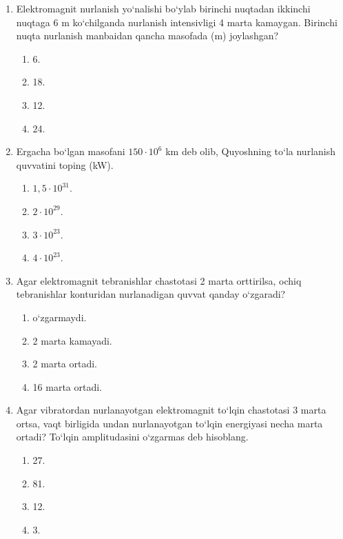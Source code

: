 \begin{enumerate}
\item Elektromagnit nurlanish yo‘nalishi bo‘ylab birinchi nuqtadan ikkinchi nuqtaga 6 m ko‘chilganda nurlanish intensivligi 4 marta kamaygan. Birinchi nuqta nurlanish manbaidan qancha masofada (m) joylashgan?
\begin{enumerate}[label=\Alph*)]
\item 6.
\item 18.
\item 12.
\item 24.
\end{enumerate}

\item Ergacha bo‘lgan masofani $150\cdot 10^6$ km deb olib, Quyoshning to‘la nurlanish quvvatini toping (kW).
\begin{enumerate}[label=\Alph*)]
\item $1,5\cdot 10^{31}$.
\item $2\cdot 10^{29}$.
\item $3\cdot 10^{23}$.
\item $4\cdot 10^{23}$.
\end{enumerate}

\item Agar elektromagnit tebranishlar chastotasi 2 marta orttirilsa, ochiq tebranishlar konturidan nurlanadigan quvvat qanday o‘zgaradi?
\begin{enumerate}[label=\Alph*)]
\item o‘zgarmaydi.
\item 2 marta kamayadi.
\item 2 marta ortadi.
\item 16 marta ortadi.
\end{enumerate}

\item Agar vibratordan nurlanayotgan elektromagnit to‘lqin chastotasi 3 marta ortsa, vaqt birligida undan nurlanayotgan to‘lqin energiyasi necha marta ortadi? To‘lqin amplitudasini o‘zgarmas deb hisoblang.
\begin{enumerate}[label=\Alph*)]
\item 27.
\item 81.
\item 12.
\item 3.
\end{enumerate}

\end{enumerate}





